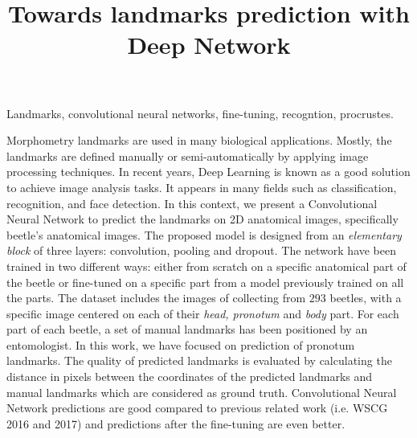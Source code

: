 \documentclass[10pt]{article}
\begin{document}
\noindent



\title{Towards landmarks prediction with Deep Network}




\maketitle

\keywords
Landmarks, convolutional neural networks, fine-tuning, recogntion, procrustes.

\abstract
Morphometry landmarks are used in many biological
applications. Mostly, the landmarks are defined manually or
semi-automatically by applying image processing techniques. In recent
years, Deep Learning is known as a good solution to achieve image analysis tasks. It appears in many fields such as
classification, recognition, and face detection. In this context, we
present a Convolutional Neural Network to predict the landmarks on 2D
anatomical images, specifically beetle's anatomical images. The proposed model is designed from an \textit{elementary block} of three layers: convolution, pooling and dropout. The network have been trained in two different ways: either from scratch on a specific anatomical part of the beetle or fine-tuned on a specific part from a model previously trained on all the parts. The dataset includes the images of 
collecting from $293$ beetles, with a specific image centered on each of their \textit{head, pronotum} and \textit{body} part.
 For each part of each beetle, a set of manual landmarks has been positioned by an entomologist. In this work, we have focused on prediction of pronotum landmarks. The quality of predicted landmarks
is evaluated by calculating the distance in pixels between the
coordinates of the predicted landmarks and manual landmarks which are
considered as ground truth. Convolutional Neural Network predictions are good compared to previous related work (i.e. WSCG 2016 and 2017) and predictions after the fine-tuning are even better.
\end{document}

